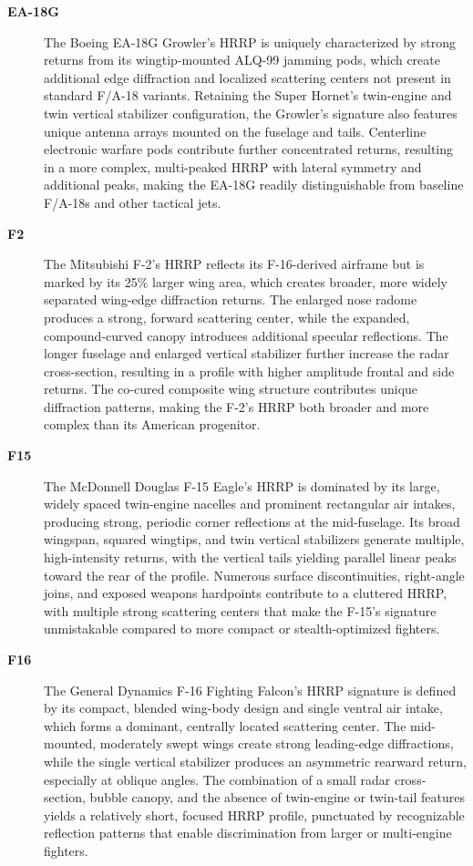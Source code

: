{\begin{description}
    \item[\textbf{EA-18G}]
    The Boeing EA-18G Growler's HRRP is uniquely characterized by strong returns from its wingtip-mounted ALQ-99 jamming pods, which create additional edge diffraction and localized scattering centers not present in standard F/A-18 variants. Retaining the Super Hornet's twin-engine and twin vertical stabilizer configuration, the Growler's signature also features unique antenna arrays mounted on the fuselage and tails. Centerline electronic warfare pods contribute further concentrated returns, resulting in a more complex, multi-peaked HRRP with lateral symmetry and additional peaks, making the EA-18G readily distinguishable from baseline F/A-18s and other tactical jets.

    \item[\textbf{F2}]
    The Mitsubishi F-2's HRRP reflects its F-16-derived airframe but is marked by its 25\% larger wing area, which creates broader, more widely separated wing-edge diffraction returns. The enlarged nose radome produces a strong, forward scattering center, while the expanded, compound-curved canopy introduces additional specular reflections. The longer fuselage and enlarged vertical stabilizer further increase the radar cross-section, resulting in a profile with higher amplitude frontal and side returns. The co-cured composite wing structure contributes unique diffraction patterns, making the F-2's HRRP both broader and more complex than its American progenitor.

    \item[\textbf{F15}]
    The McDonnell Douglas F-15 Eagle's HRRP is dominated by its large, widely spaced twin-engine nacelles and prominent rectangular air intakes, producing strong, periodic corner reflections at the mid-fuselage. Its broad wingspan, squared wingtips, and twin vertical stabilizers generate multiple, high-intensity returns, with the vertical tails yielding parallel linear peaks toward the rear of the profile. Numerous surface discontinuities, right-angle joins, and exposed weapons hardpoints contribute to a cluttered HRRP, with multiple strong scattering centers that make the F-15's signature unmistakable compared to more compact or stealth-optimized fighters.

    \item[\textbf{F16}]
    The General Dynamics F-16 Fighting Falcon's HRRP signature is defined by its compact, blended wing-body design and single ventral air intake, which forms a dominant, centrally located scattering center. The mid-mounted, moderately swept wings create strong leading-edge diffractions, while the single vertical stabilizer produces an asymmetric rearward return, especially at oblique angles. The combination of a small radar cross-section, bubble canopy, and the absence of twin-engine or twin-tail features yields a relatively short, focused HRRP profile, punctuated by recognizable reflection patterns that enable discrimination from larger or multi-engine fighters.


\end{description}}
